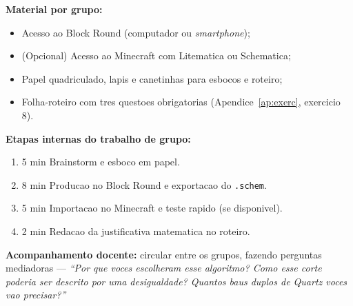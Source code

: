 \documentclass[12pt,a4paper]{scrartcl}
\newcommand{\tempo}[1]{\textnormal{\footnotesize\color{bg!90!white}\textsf{#1}}}
\begin{document}
\begin{atividade}[5.3 --- Producao \quad\tempo{20 min}]\label{at:53}
\textbf{Material por grupo:}
\begin{itemize}[leftmargin=1.3em,itemsep=0.15em,topsep=0.3em,nosep]
  \item Acesso ao Block Round (computador ou \emph{smartphone});
  \item (Opcional) Acesso ao Minecraft com Litematica ou Schematica;
  \item Papel quadriculado, lapis e canetinhas para esbocos e roteiro;
  \item Folha-roteiro com tres questoes obrigatorias (Apendice~\ref{ap:exerc}, exercicio 8).
\end{itemize}

\textbf{Etapas internas do trabalho de grupo:}
\begin{enumerate}[leftmargin=1.5em,itemsep=0.15em,topsep=0.3em,nosep]
  \item \tempo{5 min} Brainstorm e esboco em papel.
  \item \tempo{8 min} Producao no Block Round e exportacao do \texttt{.schem}.
  \item \tempo{5 min} Importacao no Minecraft e teste rapido (se disponivel).
  \item \tempo{2 min} Redacao da justificativa matematica no roteiro.
\end{enumerate}

\textbf{Acompanhamento docente:} circular entre os grupos, fazendo perguntas mediadoras --- \emph{\enquote{Por que voces escolheram esse algoritmo? Como esse corte poderia ser descrito por uma desigualdade? Quantos baus duplos de Quartz voces vao precisar?}}
\end{atividade}
\end{document}
